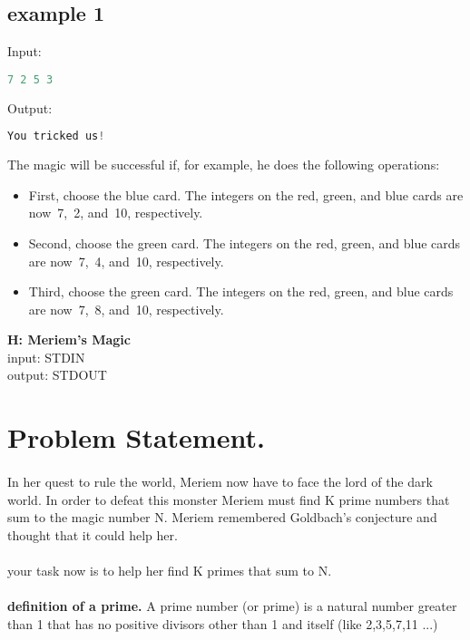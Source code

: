 \documentclass[10pt]{article}
\begin{document}
\subsection{example 1}
Input:
\begin{lstlisting}[language=Python]
7 2 5 3 
\end{lstlisting}
Output:
\begin{lstlisting}[language=Python]
You tricked us!
\end{lstlisting}
The magic will be successful if, for example, he does the following operations:
\begin{itemize}
\item First, choose the blue card. The integers on the red, green, and blue cards are now 7, 2, and 10, respectively.
\item Second, choose the green card. The integers on the red, green, and blue cards are now 7, 4, and 10, respectively.
\item Third, choose the green card. The integers on the red, green, and blue cards are now 7, 8, and 10, respectively.
\end{itemize}
\newpage
\begin{center}
    \Huge { \textbf{H: Meriem's Magic}}\\
\normalsize  { input:  STDIN}\\
\normalsize{    output: STDOUT}
\end{center}

\section{Problem Statement.}
\paragraph{}
In her quest to rule the world, Meriem now have to face the lord of the dark world.
In order to defeat this monster Meriem must find K prime numbers that sum to the
magic number N. Meriem remembered Goldbach's conjecture and thought that it could help her.
\paragraph{}
your task now is to help her find K primes that sum to N.
\paragraph{}
\textbf{definition of a prime.}
A prime number (or prime) is a natural number greater than 1 that has no positive divisors other than 1 and itself
(like 2,3,5,7,11 ...)
\end{document}
